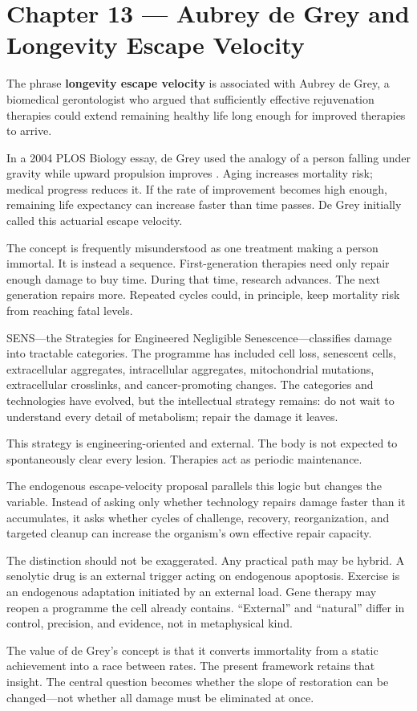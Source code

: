 \chapter{Chapter 13 --- Aubrey de Grey and Longevity Escape Velocity}\label{chapter-13-aubrey-de-grey-and-longevity-escape-velocity}

The phrase \textbf{longevity escape velocity} is associated with Aubrey de Grey, a biomedical gerontologist who argued that sufficiently effective rejuvenation therapies could extend remaining healthy life long enough for improved therapies to arrive.

In a 2004 PLOS Biology essay, de Grey used the analogy of a person falling under gravity while upward propulsion improves \autocite{degrey2004escape}. Aging increases mortality risk; medical progress reduces it. If the rate of improvement becomes high enough, remaining life expectancy can increase faster than time passes. De Grey initially called this actuarial escape velocity.

The concept is frequently misunderstood as one treatment making a person immortal. It is instead a sequence. First-generation therapies need only repair enough damage to buy time. During that time, research advances. The next generation repairs more. Repeated cycles could, in principle, keep mortality risk from reaching fatal levels.

SENS---the Strategies for Engineered Negligible Senescence---classifies damage into tractable categories. The programme has included cell loss, senescent cells, extracellular aggregates, intracellular aggregates, mitochondrial mutations, extracellular crosslinks, and cancer-promoting changes. The categories and technologies have evolved, but the intellectual strategy remains: do not wait to understand every detail of metabolism; repair the damage it leaves.

This strategy is engineering-oriented and external. The body is not expected to spontaneously clear every lesion. Therapies act as periodic maintenance.

The endogenous escape-velocity proposal parallels this logic but changes the variable. Instead of asking only whether technology repairs damage faster than it accumulates, it asks whether cycles of challenge, recovery, reorganization, and targeted cleanup can increase the organism's own effective repair capacity.

The distinction should not be exaggerated. Any practical path may be hybrid. A senolytic drug is an external trigger acting on endogenous apoptosis. Exercise is an endogenous adaptation initiated by an external load. Gene therapy may reopen a programme the cell already contains. ``External'' and ``natural'' differ in control, precision, and evidence, not in metaphysical kind.

The value of de Grey's concept is that it converts immortality from a static achievement into a race between rates. The present framework retains that insight. The central question becomes whether the slope of restoration can be changed---not whether all damage must be eliminated at once.
